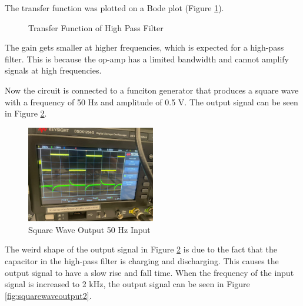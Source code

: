 \documentclass[12pt]{article}
\begin{document}
The transfer function was plotted on a Bode plot (Figure \ref{fig:transferfunctionplot}).
\begin{figure}[H]
  \centering
  \caption{Transfer Function of High Pass Filter}
  \label{fig:transferfunctionplot}
\end{figure}

The gain gets smaller at higher frequencies, which is expected for a
high-pass filter. This is because the op-amp has a limited bandwidth
and cannot amplify signals at high frequencies.
\newline

Now the circuit is connected to a funciton generator that produces a square
wave with a frequency of 50 Hz and amplitude of 0.5 V. The output signal can be
seen in Figure \ref{fig:squarewaveoutput1}.

\begin{figure}[H]
  \centering
  \includegraphics[width=0.5\textwidth]{photos/Oscilloscope 2.jpg}
  \caption{Square Wave Output 50 Hz Input}
  \label{fig:squarewaveoutput1}
\end{figure}

The weird shape of the output signal in Figure \ref{fig:squarewaveoutput1} is due to
the fact that the capacitor
in the high-pass filter is charging and discharging. This causes
the output signal to have a slow rise and fall time. When the frequency
of the input signal is increased to 2 kHz, the output signal can be seen in
Figure \ref{fig:squarewaveoutput2}.
\newline
\end{document}
